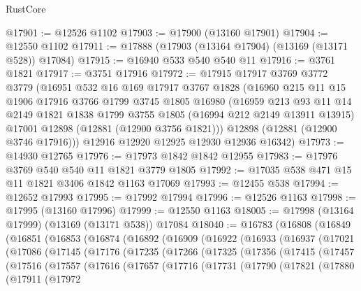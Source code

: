 \begin{lexlean}{RustCore}
\begin{coremodule}
@17901 := @12526 @1102
@17903 := @17900 (@13160 @17901)
@17904 := @12550 @1102
@17911 := @17888 (@17903 (@13164 @17904) (@13169 (@13171 @528)) @17084)
@17915 := @16940 @533 @540 @540 @11
@17916 := @3761 @1821
@17917 := @3751 @17916
@17972 := @17915
    @17917
    @3769
    @3772
    @3779
    (@16951
      @532
      @16
      @169
      @17917
      @3767
      @1828
      (@16960
        @215
        @11
        @15
        @1906
        @17916
        @3766
        @1799
        @3745
        @1805
        @16980
        (@16959
          @213
          @93
          @11
          @14
          @2149
          @1821
          @1838
          @1799
          @3755
          @1805
          (@16994 @212 @2149 @13911 @13915)
          @17001
          @12898
          (@12881 (@12900 @3756 @1821)))
        @12898
        (@12881 (@12900 @3746 @17916)))
      @12916
      @12920
      @12925
      @12930
      @12936
      @16342)
@17973 := @14930 @12765
@17976 := @17973 @1842 @1842 @12955
@17983 := @17976 @3769 @540 @540 @11 @1821 @3779 @1805
@17992 := @17035 @538 @471 @15 @11 @1821 @3406 @1842 @1163 @17069
@17993 := @12455 @538
@17994 := @12652 @17993
@17995 := @17992 @17994
@17996 := @12526 @1163
@17998 := @17995 (@13160 @17996)
@17999 := @12550 @1163
@18005 := @17998 (@13164 @17999) (@13169 (@13171 @538)) @17084
@18040 := @16783
    (@16808
      (@16849
        (@16851
          (@16853
            (@16874
              (@16892
                (@16909
                  (@16922
                    (@16933
                      (@16937
                        (@17021
                          (@17086
                            (@17145
                              (@17176
                                (@17235
                                  (@17266
                                    (@17325
                                      (@17356
                                        (@17415
                                          (@17457
                                            (@17516
                                              (@17557
                                                (@17616
                                                  (@17657
                                                    (@17716
                                                      (@17731
                                                        (@17790
                                                          (@17821
                                                            (@17880
                                                              (@17911
                                                                (@17972

\end{coremodule}
\end{lexlean}
